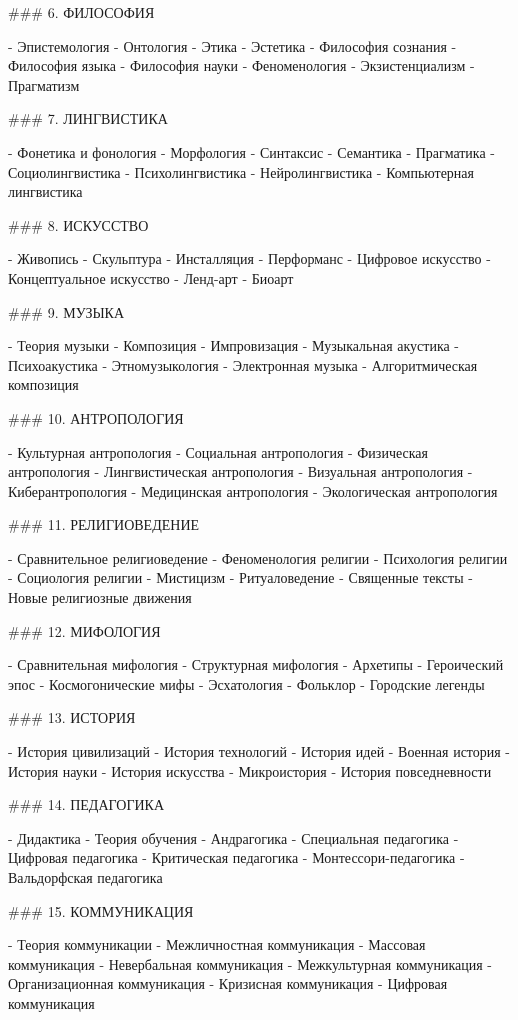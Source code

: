 ### 6. ФИЛОСОФИЯ

- Эпистемология
- Онтология
- Этика
- Эстетика
- Философия сознания
- Философия языка
- Философия науки
- Феноменология
- Экзистенциализм
- Прагматизм

### 7. ЛИНГВИСТИКА

- Фонетика и фонология
- Морфология
- Синтаксис
- Семантика
- Прагматика
- Социолингвистика
- Психолингвистика
- Нейролингвистика
- Компьютерная лингвистика

### 8. ИСКУССТВО

- Живопись
- Скульптура
- Инсталляция
- Перформанс
- Цифровое искусство
- Концептуальное искусство
- Ленд-арт
- Биоарт

### 9. МУЗЫКА

- Теория музыки
- Композиция
- Импровизация
- Музыкальная акустика
- Психоакустика
- Этномузыкология
- Электронная музыка
- Алгоритмическая композиция

### 10. АНТРОПОЛОГИЯ

- Культурная антропология
- Социальная антропология
- Физическая антропология
- Лингвистическая антропология
- Визуальная антропология
- Киберантропология
- Медицинская антропология
- Экологическая антропология

### 11. РЕЛИГИОВЕДЕНИЕ

- Сравнительное религиоведение
- Феноменология религии
- Психология религии
- Социология религии
- Мистицизм
- Ритуаловедение
- Священные тексты
- Новые религиозные движения

### 12. МИФОЛОГИЯ

- Сравнительная мифология
- Структурная мифология
- Архетипы
- Героический эпос
- Космогонические мифы
- Эсхатология
- Фольклор
- Городские легенды

### 13. ИСТОРИЯ

- История цивилизаций
- История технологий
- История идей
- Военная история
- История науки
- История искусства
- Микроистория
- История повседневности

### 14. ПЕДАГОГИКА

- Дидактика
- Теория обучения
- Андрагогика
- Специальная педагогика
- Цифровая педагогика
- Критическая педагогика
- Монтессори-педагогика
- Вальдорфская педагогика

### 15. КОММУНИКАЦИЯ

- Теория коммуникации
- Межличностная коммуникация
- Массовая коммуникация
- Невербальная коммуникация
- Межкультурная коммуникация
- Организационная коммуникация
- Кризисная коммуникация
- Цифровая коммуникация

